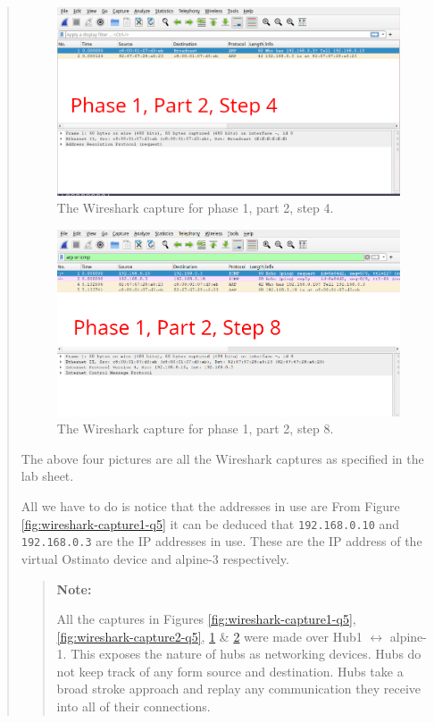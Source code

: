 \documentclass{article}
\newenvironment{ans}
{\fbox{Answer}\begin{quote}\nopagebreak}
{\end{quote}}
\newenvironment{note}{%
\begin{quote}
\begin{tcolorbox}[colback=gray!10,arc=0mm,boxrule=0pt]
\raggedright
\textbf{Note:}%
}{%
\end{tcolorbox}
\end{quote}%
}
\begin{document}
\begin{ans}
\begin{figure}[H]
\centering
\includegraphics[width=14cm]{data/q5-capture3.png}
\caption{The Wireshark capture for phase 1, part 2, step 4.}
\label{fig:wireshark-capture3-q5}
\end{figure}

\begin{figure}[H]
\centering
\includegraphics[width=14cm]{data/q5-capture4.png}
\caption{The Wireshark capture for phase 1, part 2, step 8.}
\label{fig:wireshark-capture4-q5}
\end{figure}

The above four pictures are all the Wireshark captures as
specified in the lab sheet.

All we have to do is notice that the addresses in use are
From Figure \ref{fig:wireshark-capture1-q5} it can be
deduced that \texttt{192.168.0.10} and \texttt{192.168.0.3}
are the IP addresses in use. These are the IP address of
the virtual Ostinato device and alpine-3 respectively.

\begin{note}
All the captures in Figures
\ref{fig:wireshark-capture1-q5},
\ref{fig:wireshark-capture2-q5},
\ref{fig:wireshark-capture3-q5} \&
\ref{fig:wireshark-capture4-q5} were made over
Hub1 $\leftrightarrow$ alpine-1. This exposes
the nature of hubs as networking devices. Hubs
do not keep track of any form source and
destination. Hubs take a broad stroke approach
and replay any communication they receive into
all of their connections.
\end{note}
\end{ans}
\end{document}
